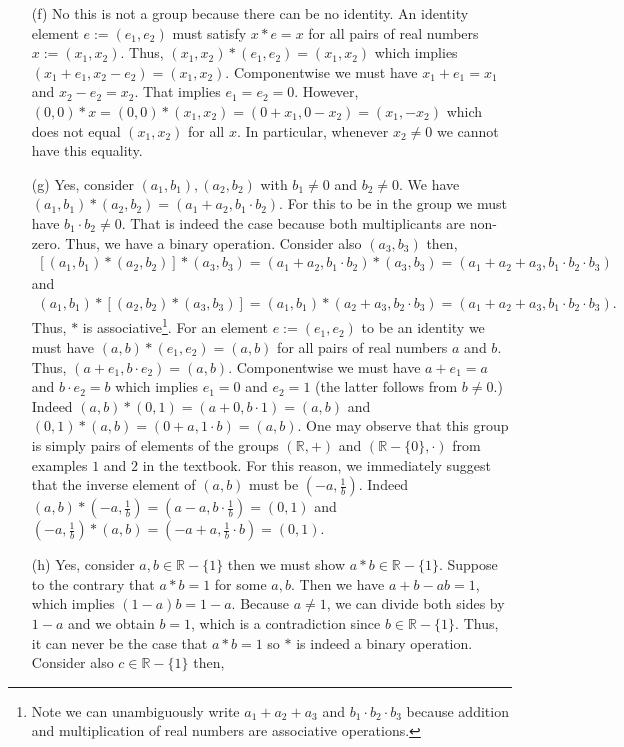 \documentclass[12pt]{article}
\def\R{{\mathbb R}}        %
\numberwithin{theorem}{section}
\numberwithin{equation}{section}
\numberwithin{remark}{section}
\numberwithin{definition}{section}
\numberwithin{theorem}{section}
\numberwithin{lemma}{section}
\numberwithin{example}{section}
\begin{document}
\begin{itemize}
	\item[(f)]{No this is not a group because there can be no identity. An identity element $e:=(e_1,e_2)$ must satisfy $x*e=x$ for all pairs of real numbers $x:=(x_1,x_2)$. Thus, $(x_1,x_2)*(e_1,e_2)=(x_1,x_2)$ which implies $(x_1+e_1,x_2-e_2)=(x_1,x_2)$. Componentwise we must have $x_1+e_1=x_1$ and $x_2-e_2=x_2$. That implies $e_1=e_2=0$. However, $(0,0)*x=(0,0)*(x_1,x_2)=(0+x_1,0-x_2)=(x_1,-x_2)$ which does not equal $(x_1,x_2)$ for all $x$. In particular, whenever $x_2\neq0$ we cannot have this equality.}
	\item[(g)]{Yes, consider $(a_1,b_1),(a_2,b_2)$ with $b_1\neq0$ and $b_2\neq0$. We have $(a_1,b_1)*(a_2,b_2)=(a_1+a_2,b_1\cdot b_2)$. For this to be in the group we must have $b_1\cdot b_2\neq0$. That is indeed the case because both multiplicants are non-zero. Thus, we have a binary operation. Consider also $(a_3,b_3)$ then,
		\begin{align*}
			\left[(a_1,b_1)*(a_2,b_2)\right]*(a_3,b_3)=(a_1+a_2,b_1\cdot b_2)*(a_3,b_3)=(a_1+a_2+a_3,b_1\cdot b_2\cdot b_3)
		\end{align*}
	and
		\begin{align*}
			(a_1,b_1)*\left[(a_2,b_2)*(a_3,b_3)\right]=(a_1,b_1)*(a_2 + a_3,b_2\cdot b_3)=(a_1+a_2+a_3,b_1\cdot b_2\cdot b_3).
		\end{align*}
	Thus, $*$ is associative\footnote{Note we can unambiguously write $a_1+a_2+a_3$ and $b_1\cdot b_2\cdot b_3$ because addition and multiplication of real numbers are associative operations.}. For an element $e:=(e_1,e_2)$ to be an identity we must have $(a,b)*(e_1,e_2)=(a,b)$ for all pairs of real numbers $a$ and $b$. Thus, $(a+e_1,b\cdot e_2)=(a,b)$. Componentwise we must have $a+e_1=a$ and $b\cdot e_2=b$ which implies $e_1=0$ and $e_2=1$ (the latter follows from $b\neq0$.) Indeed $(a,b)*(0,1)=(a+0,b\cdot1)=(a,b)$ and $(0,1)*(a,b)=(0+a,1\cdot b)=(a,b)$. One may observe that this group is simply pairs of elements of the groups $(\R,+)$ and $(\R-\{0\},\cdot)$ from examples $1$ and $2$ in the textbook. For this reason, we immediately suggest that the inverse element of $(a,b)$ must be $\left(-a,\frac{1}{b}\right)$. Indeed $(a,b)*\left(-a,\frac{1}{b}\right)=\left(a-a,b\cdot\frac{1}{b}\right)=(0,1)$ and $\left(-a,\frac{1}{b}\right)*(a,b)=\left(-a+a,\frac{1}{b}\cdot b\right)=(0,1)$.}
	\item[(h)]{Yes, consider $a,b\in\R-\{1\}$ then we must show $a*b\in\R-\{1\}$. Suppose to the contrary that $a*b=1$ for some $a,b$. Then we have $a+b-ab=1$, which implies $(1-a)b=1-a$. Because $a\neq1$, we can divide both sides by $1-a$ and we obtain $b=1$, which is a contradiction since $b\in\R-\{1\}$. Thus, it can never be the case that $a*b=1$ so $*$ is indeed a binary operation. Consider also $c\in\R-\{1\}$ then,
}
\end{itemize}
\end{document}
